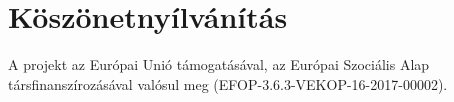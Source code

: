 




%
%


\section{K\"osz\"onetny\'ilv\'an\'it\'as}
A projekt az Európai Unió támogatásával, az Európai Szociális Alap
társfinanszírozásával valósul meg (EFOP-3.6.3-VEKOP-16-2017-00002).



